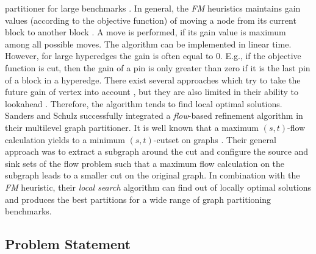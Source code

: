 partitioner for large benchmarks \cite{papa2007hypergraph}. In general, the \emph{FM}
heuristics maintains gain values (according to the objective function) of moving a node
from its current block to another block \cite{fiduccia1988linear}. A move is performed, 
if its gain value is maximum among all possible moves. The algorithm can be implemented 
in linear time. However, for large hyperedges the gain is often equal to $0$. E.g., if
the objective function is cut, then the gain of a pin is only greater than zero if it is the
last pin of a block in a hyperedge. There exist several approaches which try to take the
future gain of vertex into account \cite{krishnamurthy1984improved}, but they are also
limited in their ability to lookahead \cite{zhao2002effective}. Therefore, the algorithm
tends to find local optimal solutions. \\
Sanders and Schulz \cite{sanders2011engineering} successfully integrated a \emph{flow}-based refinement
algorithm in their multilevel graph partitioner. It is well known that a maximum $(s,t)$-flow
calculation yields to a minimum $(s,t)$-cutset on graphs \cite{ford1956maximal}. Their general
approach was to extract a subgraph around the cut and configure the source and sink sets
of the flow problem such that a maximum flow calculation on the subgraph leads to a 
smaller cut on the original graph. In combination with the \emph{FM} heuristic, their \emph{local
search} algorithm can find out of locally optimal solutions and produces
the best partitions for a wide range of graph partitioning benchmarks. 

\subsection{Problem Statement}

